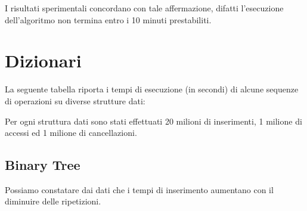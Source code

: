 \documentclass{report}
\begin{document}
I risultati sperimentali concordano con tale affermazione, difatti l'esecuzione dell'algoritmo non termina entro i 10 minuti prestabiliti.


\chapter{Dizionari}

La seguente tabella riporta i tempi di esecuzione (in secondi) di alcune sequenze di operazioni su diverse strutture dati:

\begin{table} [!htb]
\centering
{}
\end{table}

Per ogni struttura dati sono stati effettuati 20 milioni di inserimenti, 1 milione di accessi ed 1 milione di cancellazioni.

\section{Binary Tree}

Possiamo constatare dai dati che i tempi di inserimento aumentano con il diminuire delle ripetizioni.
\end{document}
